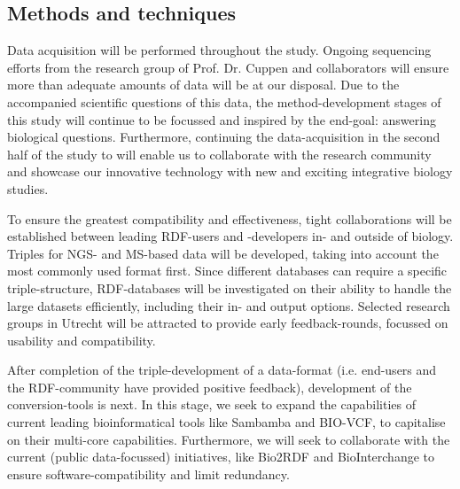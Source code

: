 \documentclass[twoside,fontsize=10pt]{article}
\begin{document}
\subsection*{Methods and techniques} %
Data acquisition will be performed throughout the study. Ongoing sequencing efforts from the research group of Prof. Dr. Cuppen and collaborators will ensure more than adequate amounts of data will be at our disposal. Due to the accompanied scientific questions of this data, the method-development stages of this study will continue to be focussed and inspired by the end-goal: answering biological questions. Furthermore, continuing the data-acquisition in the second half of the study to will enable us to collaborate with the research community and showcase our innovative technology with new and exciting integrative biology studies.
\medskip

\noindent
To ensure the greatest compatibility and effectiveness, tight collaborations will be established between leading RDF-users and -developers in- and outside of biology. Triples for NGS- and MS-based data will be developed, taking into account the most commonly used format first. Since different databases can require a specific triple-structure, RDF-databases will be investigated on their ability to handle the large datasets efficiently, including their in- and output options. Selected research groups in Utrecht will be attracted to provide early feedback-rounds, focussed on usability and compatibility. 

After completion of the triple-development of a data-format (i.e. end-users and the RDF-community have provided positive feedback), development of the conversion-tools is next. In this stage, we seek to expand the capabilities of current leading bioinformatical tools like Sambamba\cite{Tarasov2014} and BIO-VCF\cite{Goto2010}, to capitalise on their multi-core capabilities. Furthermore, we will seek to collaborate with the current (public data-focussed) initiatives, like Bio2RDF\cite{Belleau2008} and BioInterchange\cite{Baran} to ensure software-compatibility and limit redundancy.
\medskip
\end{document}
